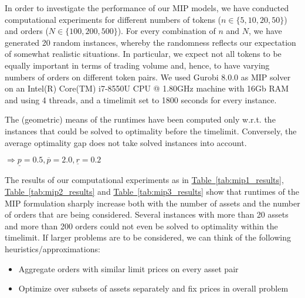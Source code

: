 \documentclass[11pt,parskip=full]{scrartcl}%
\newcommand*{\wrt}{w.r.t. }
\newcommand*{\tabref}[1]{\hyperref[{#1}]{Table~\ref*{#1}}}
\begin{document}
In order to investigate the performance of our MIP models, we have conducted computational
experiments for different numbers of tokens ($ n \in \{5,10,20,50\} $) and orders ($ N \in 
\{100,200,500\} $).
For every combination of $ n $ and $ N $, we have generated 20 random instances, whereby the
randomness reflects our expectation of somewhat realistic situations.
In particular, we expect not all tokens to be equally important in terms of trading volume and,
hence, to have varying numbers of orders on different token pairs.
We used Gurobi 8.0.0 as MIP solver on an Intel(R) Core(TM) i7-8550U CPU @ 1.80GHz machine with 16Gb
RAM and using 4 threads, and a timelimit set to 1800 seconds for every instance.

The (geometric) means of the runtimes have been computed only \wrt the instances that could be
solved to optimality before the timelimit. Conversely, the average optimality gap does not take
solved instances into account.

$ \Rightarrow \underline{p}=0.5, \overline{p}=2.0, \underline{r}=0.2 $

\vspace{-5mm}
The results of our computational experiments as in \tabref{tab:mip1_results},
\tabref{tab:mip2_results} and \tabref{tab:mip3_results} show that runtimes of the MIP formulation
sharply increase both with the number of assets and the number of orders that are being considered.
Several instances with more than 20 assets and more than 200 orders could not even be solved to
optimality within the timelimit.
If larger problems are to be considered, we can think of the following heuristics/approximations:
\begin{itemize}
    \item Aggregate orders with similar limit prices on every asset pair
    \item Optimize over subsets of assets separately and fix prices in overall problem
\end{itemize}
\end{document}
